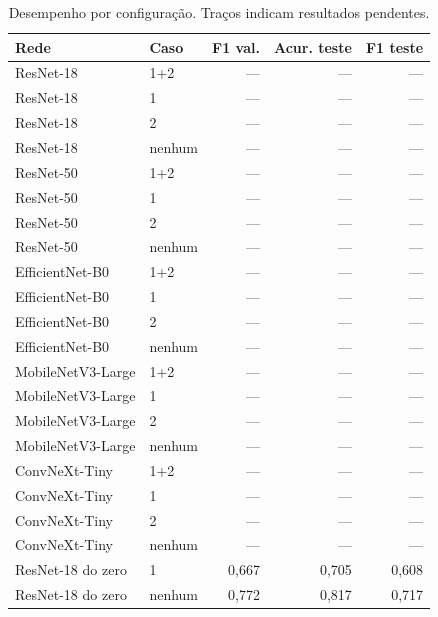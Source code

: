 \begin{table}[t]\centering\caption{Desempenho por configuração. Traços indicam resultados pendentes.}
\label{tab:gabriel}\footnotesize\begin{tabular}{llrrr}\hline
Rede & Caso & F1 val. & Acur. teste & F1 teste \\ \hline
ResNet-18 & 1+2 & --- & --- & --- \\
ResNet-18 & 1 & --- & --- & --- \\
ResNet-18 & 2 & --- & --- & --- \\
ResNet-18 & nenhum & --- & --- & --- \\
ResNet-50 & 1+2 & --- & --- & --- \\
ResNet-50 & 1 & --- & --- & --- \\
ResNet-50 & 2 & --- & --- & --- \\
ResNet-50 & nenhum & --- & --- & --- \\
EfficientNet-B0 & 1+2 & --- & --- & --- \\
EfficientNet-B0 & 1 & --- & --- & --- \\
EfficientNet-B0 & 2 & --- & --- & --- \\
EfficientNet-B0 & nenhum & --- & --- & --- \\
MobileNetV3-Large & 1+2 & --- & --- & --- \\
MobileNetV3-Large & 1 & --- & --- & --- \\
MobileNetV3-Large & 2 & --- & --- & --- \\
MobileNetV3-Large & nenhum & --- & --- & --- \\
ConvNeXt-Tiny & 1+2 & --- & --- & --- \\
ConvNeXt-Tiny & 1 & --- & --- & --- \\
ConvNeXt-Tiny & 2 & --- & --- & --- \\
ConvNeXt-Tiny & nenhum & --- & --- & --- \\
ResNet-18 do zero & 1 & 0,667 & 0,705 & 0,608 \\
ResNet-18 do zero & nenhum & 0,772 & 0,817 & 0,717 \\
\hline\end{tabular}\end{table}

